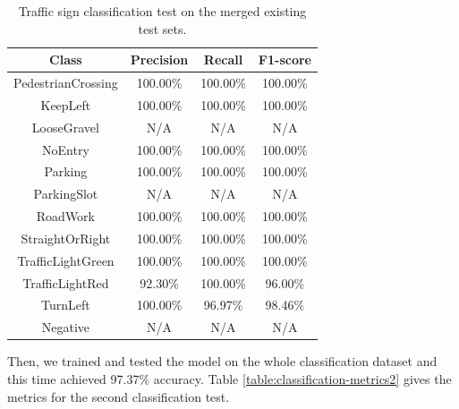 \begin{table}[h]
  \begin{center}
    \caption{Traffic sign classification test on the merged existing test sets.}
    \label{table:classification-metrics1}
    \begin{tabular}{|c|c|c|c|}
      \hline
      \textbf{Class}     & \textbf{Precision} & \textbf{Recall}  & \textbf{F1-score} \\
      \hline
      PedestrianCrossing & 100.00\%           & 100.00\%         &  100.00\% \\
      \hline
      KeepLeft           & 100.00\%           & 100.00\%         & 100.00\% \\
      \hline
      LooseGravel        &   N/A              &  N/A             &  N/A     \\
      \hline
      NoEntry            & 100.00\%           & 100.00\%         &  100.00\% \\
      \hline
      Parking            & 100.00\%           & 100.00\%         &  100.00\% \\
      \hline
      ParkingSlot        &   N/A              & N/A              &    N/A   \\
      \hline
      RoadWork           & 100.00\%           & 100.00\%         &  100.00\% \\
      \hline
      StraightOrRight    & 100.00\%           & 100.00\%         & 100.00\%  \\
      \hline
      TrafficLightGreen  & 100.00\%           & 100.00\%         & 100.00\%  \\
      \hline
      TrafficLightRed    & 92.30\%            & 100.00\%         & 96.00\%  \\
      \hline
      TurnLeft           & 100.00\%           & 96.97\%          & 98.46\%  \\
      \hline
      Negative           & N/A                & N/A              & N/A      \\
      \hline
    \end{tabular}
  \end{center}
\end{table}

Then, we trained and tested the model on the whole classification dataset and
this time achieved 97.37\% accuracy. Table \ref{table:classification-metrics2}
gives the metrics for the second classification test.

